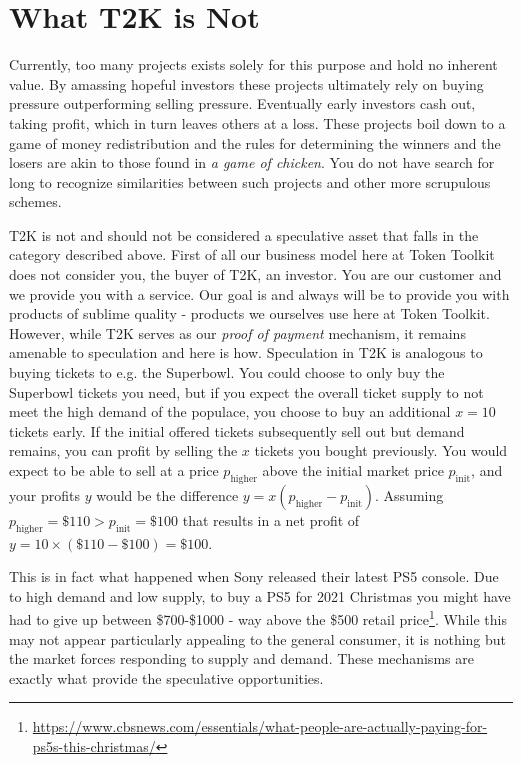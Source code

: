 \documentclass[11pt]{article}
\begin{document}
\section*{What T2K is Not}
\label{sec:orgfff7193}

Currently, too many projects exists solely for this purpose and hold no inherent
value. By amassing hopeful investors these projects ultimately rely on buying
pressure outperforming selling pressure. Eventually early investors cash out,
taking profit, which in turn leaves others at a loss. These projects boil down
to a game of money redistribution and the rules for determining the winners and
the losers are akin to those found in \emph{a game of chicken}. You do not have
search for long to recognize similarities between such projects and other more
scrupulous schemes.

T2K is not and should not be considered a speculative asset that falls in the
category described above. First of all our business model here at Token Toolkit
does not consider you, the buyer of T2K, an investor. You are our customer and
we provide you with a service. Our goal is and always will be to provide you
with products of sublime quality - products we ourselves use here at Token
Toolkit. However, while T2K serves as our \emph{proof of payment} mechanism, it
remains amenable to speculation and here is how. Speculation in T2K is analogous
to buying tickets to e.g. the Superbowl. You could choose to only buy the
Superbowl tickets you need, but if you expect the overall ticket supply to not
meet the high demand of the populace, you choose to buy an additional \(x=10\)
tickets early. If the initial offered tickets subsequently sell out but demand
remains, you can profit by selling the \(x\) tickets you bought previously. You
would expect to be able to sell at a price \(p_{\text{higher}}\) above the
initial market price \(p_{\text{init}}\), and your profits \(y\) would be the
difference \(y=x(p_{\text{higher}}-p_{\text{init}})\). Assuming
\(p_{\text{higher}}=\$110 > p_{\text{init}} = \$100\) that results in a net
profit of \(y=10\times (\$110 -\$100) = \$100\).

This is in fact what happened when Sony released their latest PS5 console. Due
to high demand and low supply, to buy a PS5 for 2021 Christmas you might have
had to give up between \$700-\$1000 - way above the \$500 retail price\footnote{\url{https://www.cbsnews.com/essentials/what-people-are-actually-paying-for-ps5s-this-christmas/}}. While
this may not appear particularly appealing to the general consumer, it is
nothing but the market forces responding to supply and demand. These mechanisms
are exactly what provide the speculative opportunities.
\end{document}

